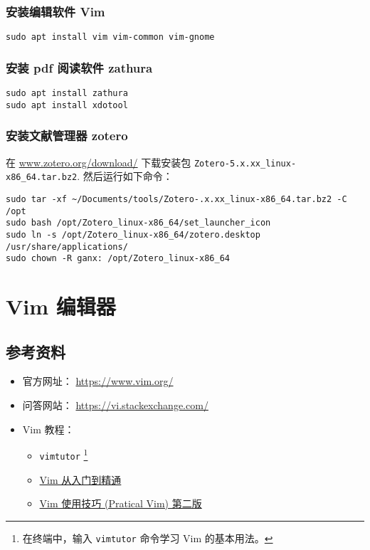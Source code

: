 \documentclass[
    11pt,
    cite=authoryear,
    device=normal,
    lang=cn,
    mode=simple,
    result=answer,
    toc=onecol,
]{elegantbook_sierxue}
\begin{document}
\subsubsection{安装编辑软件 Vim}%
\label{ssub:vm-apt-vim}

\begin{lstlisting}[escapeinside=``]
sudo apt install vim vim-common vim-gnome
\end{lstlisting}

\subsubsection{安装 pdf 阅读软件 zathura}%
\label{ssub:vm-zathura}

\begin{lstlisting}[escapeinside=``]
sudo apt install zathura
sudo apt install xdotool
\end{lstlisting}

\subsubsection{安装文献管理器 zotero}%
\label{ssub:vm-zotero}

在 \href{https://www.zotero.org/download/}{www.zotero.org/download/}
下载安装包 \lstinline{Zotero-5.x.xx_linux-x86_64.tar.bz2}.
然后运行如下命令：
\begin{lstlisting}[escapeinside=``]
sudo tar -xf ~/Documents/tools/Zotero-.x.xx_linux-x86_64.tar.bz2 -C /opt
sudo bash /opt/Zotero_linux-x86_64/set_launcher_icon
sudo ln -s /opt/Zotero_linux-x86_64/zotero.desktop /usr/share/applications/
sudo chown -R ganx: /opt/Zotero_linux-x86_64
\end{lstlisting}

\newpage
\section{Vim 编辑器}%
\label{sec:vim}

\subsection{参考资料}%
\label{sub:vim-refs}

\begin{itemize}
    \item 官方网址： \href{https://www.vim.org/}{https://www.vim.org/}
    \item 问答网站：
        \href{https://vi.stackexchange.com/}{https://vi.stackexchange.com/}
    \item Vim 教程：
        \begin{itemize}
            \item \lstinline{vimtutor}
                \footnote{在终端中，输入 \lstinline{vimtutor} 命令学习 Vim
                的基本用法。}
            \item \href{https://github.com/wsdjeg/vim-galore-zh_cn}
                {Vim 从入门到精通}
            \item \href{https://item.jd.com/12056490.html}
                {Vim 使用技巧 (Pratical Vim) 第二版}
        \end{itemize}
\end{itemize}
\end{document}
